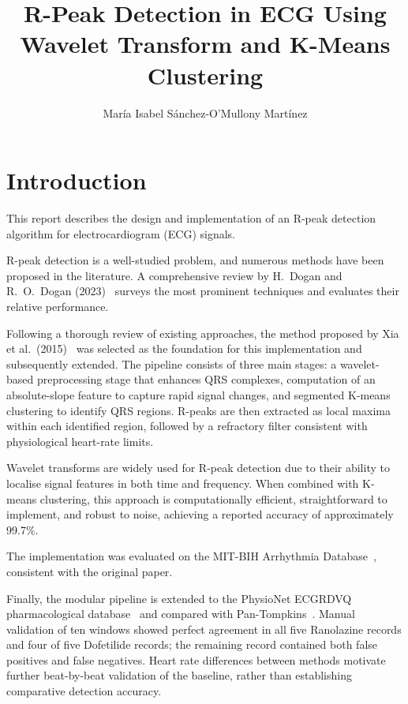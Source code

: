 \documentclass[11pt]{article}
\title{\textbf{R-Peak Detection in ECG Using Wavelet Transform and K-Means Clustering}}
\author{María Isabel Sánchez-O'Mullony Martínez}
\begin{document}
\maketitle


\section{Introduction}\label{sec:intro}
This report describes the design and implementation of an R-peak detection algorithm for electrocardiogram (ECG) signals.

R-peak detection is a well-studied problem, and numerous methods have been proposed in the literature. A comprehensive review by H.\ Dogan and R.\ O.\ Dogan (2023)~\cite{dogan_comprehensive_2023} surveys the most prominent techniques and evaluates their relative performance.

Following a thorough review of existing approaches, the method proposed by Xia et al.\ (2015)~\cite{xia_quick_2015} was selected as the foundation for this implementation and subsequently extended. The pipeline consists of three main stages: a wavelet-based preprocessing stage that enhances QRS complexes, computation of an absolute-slope feature to capture rapid signal changes, and segmented K-means clustering to identify QRS regions. R-peaks are then extracted as local maxima within each identified region, followed by a refractory filter consistent with physiological heart-rate limits.

Wavelet transforms are widely used for R-peak detection due to their ability to localise signal features in both time and frequency. When combined with K-means clustering, this approach is computationally efficient, straightforward to implement, and robust to noise, achieving a reported accuracy of approximately 99.7\%.

The implementation was evaluated on the MIT-BIH Arrhythmia Database~\cite{mitbih_physionet}, consistent with the original paper.

Finally, the modular pipeline is extended to the PhysioNet ECGRDVQ pharmacological database~\cite{physionet_ecgrdvq} and compared with Pan-Tompkins~\cite{pan_real-time_1985}. Manual validation of ten windows showed perfect agreement in all five Ranolazine records and four of five Dofetilide records; the remaining record contained both false positives and false negatives. Heart rate differences between methods motivate further beat-by-beat validation of the baseline, rather than establishing comparative detection accuracy.
\end{document}
